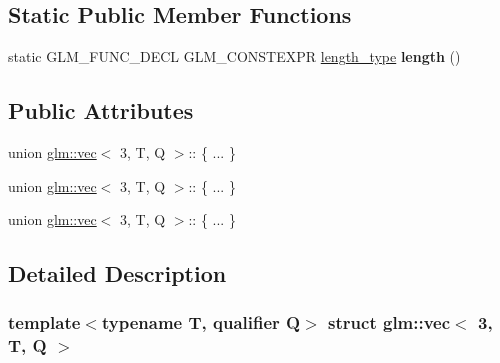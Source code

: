 \subsection*{Static Public Member Functions}
\begin{DoxyCompactItemize}
\item 
\mbox{\label{structglm_1_1vec_3_013_00_01T_00_01Q_01_4_a0dc7ddc517098d4c8257187df6be4cef}} 
static G\+L\+M\+\_\+\+F\+U\+N\+C\+\_\+\+D\+E\+CL G\+L\+M\+\_\+\+C\+O\+N\+S\+T\+E\+X\+PR \hyperlink{structglm_1_1vec_3_013_00_01T_00_01Q_01_4_ab586a87f82719bfdd180336a98843257}{length\+\_\+type} {\bfseries length} ()
\end{DoxyCompactItemize}
\subsection*{Public Attributes}
\begin{DoxyCompactItemize}
\item 
\mbox{\label{structglm_1_1vec_3_013_00_01T_00_01Q_01_4_a919a248e5f1145c1ed82322317f1eeb2}} 
union \hyperlink{structglm_1_1vec}{glm\+::vec}$<$ 3, T, Q $>$\+:: \{ ... \}  
\item 
\mbox{\label{structglm_1_1vec_3_013_00_01T_00_01Q_01_4_a9131f4256327d63918d6635245444a20}} 
union \hyperlink{structglm_1_1vec}{glm\+::vec}$<$ 3, T, Q $>$\+:: \{ ... \}  
\item 
\mbox{\label{structglm_1_1vec_3_013_00_01T_00_01Q_01_4_adccc12967900d5313a023b018e753a30}} 
union \hyperlink{structglm_1_1vec}{glm\+::vec}$<$ 3, T, Q $>$\+:: \{ ... \}  
\end{DoxyCompactItemize}


\subsection{Detailed Description}
\subsubsection*{template$<$typename T, qualifier Q$>$\newline
struct glm\+::vec$<$ 3, T, Q $>$}



